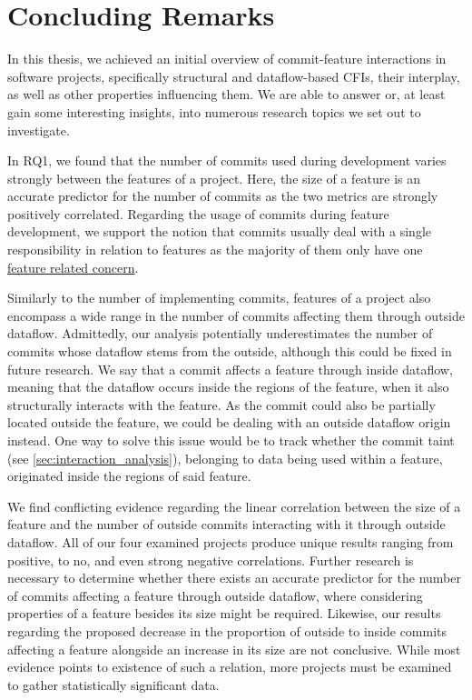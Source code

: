 \chapter{Concluding Remarks}\label{ch:conclusion}

In this thesis, we achieved an initial overview of commit-feature interactions in software projects, specifically structural and dataflow-based CFIs, their interplay, as well as other properties influencing them.
We are able to answer or, at least gain some interesting insights, into numerous research topics we set out to investigate. 

In RQ1, we found that the number of commits used during development varies strongly between the features of a project.
Here, the size of a feature is an accurate predictor for the number of commits as the two metrics are strongly positively correlated.
Regarding the usage of commits during feature development, we support the notion that commits usually deal with a single responsibility in relation to features as the majority of them only have one \hyperref[sec:commit_concerns]{feature related concern}. 

Similarly to the number of implementing commits, features of a project also encompass a wide range in the number of commits affecting them through outside dataflow.
Admittedly, our analysis potentially underestimates the number of commits whose dataflow stems from the outside, although this could be fixed in future research.
We say that a commit affects a feature through inside dataflow, meaning that the dataflow occurs inside the regions of the feature, when it also structurally interacts with the feature.
As the commit could also be partially located outside the feature, we could be dealing with an outside dataflow origin instead.
One way to solve this issue would be to track whether the commit taint (see \autoref{sec:interaction_analysis}), belonging to data being used within a feature, originated inside the regions of said feature. 

We find conflicting evidence regarding the linear correlation between the size of a feature and the number of outside commits interacting with it through outside dataflow.
All of our four examined projects produce unique results ranging from positive, to no, and even strong negative correlations.
Further research is necessary to determine whether there exists an accurate predictor for the number of commits affecting a feature through outside dataflow, where considering properties of a feature besides its size might be required.
Likewise, our results regarding the proposed decrease in the proportion of outside to inside commits affecting a feature alongside an increase in its size are not conclusive.
While most evidence points to existence of such a relation, more projects must be examined to gather statistically significant data. 

